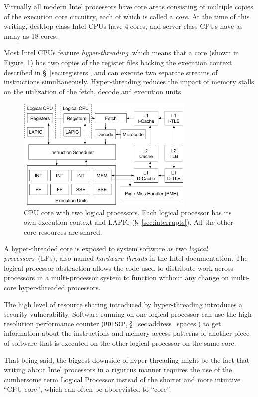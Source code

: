 Virtually all modern Intel processors have core areas consisting of multiple
copies of the execution core circuitry, each of which is called a
\textit{core}.  At the time of this writing, desktop-class Intel CPUs have 4
cores, and server-class CPUs have as many as 18 cores.

Most Intel CPUs feature \textit{hyper-threading}, which means that a core
(shown in Figure~\ref{fig:cpu_core}) has two copies of the register files
backing the execution context described in \S~\ref{sec:registers}, and can
execute two separate streams of instructions simultaneously. Hyper-threading
reduces the impact of memory stalls on the utilization of the fetch, decode and
execution units.

\begin{figure}[hbt]
  \centering
  \includegraphics[width=85mm]{figures/cpu_core.pdf}
  \caption{
    CPU core with two logical processors. Each logical processor has its own
    execution context and LAPIC (\S~\ref{sec:interrupts}). All the other core
    resources are shared.
  }
  \label{fig:cpu_core}
\end{figure}

A hyper-threaded core is exposed to system software as two \textit{logical
processors}~(LPs), also named \textit{hardware threads} in the Intel
documentation. The logical processor abstraction allows the code used to
distribute work across processors in a multi-processor system to function
without any change on multi-core hyper-threaded processors.

The high level of resource sharing introduced by hyper-threading introduces a
security vulnerability. Software running on one logical processor can use the
high-resolution performance counter (\texttt{RDTSCP},
\S~\ref{sec:address_spaces}) \cite{petters1999making} to get information about
the instructions and memory access patterns of another piece of software that
is executed on the other logical processor on the same core.

That being said, the biggest downside of hyper-threading might be the fact that
writing about Intel processors in a rigurous manner requires the use of the
cumbersome term Logical Processor instead of the shorter and more intuitive
``CPU core'', which can often be abbreviated to ``core''.

